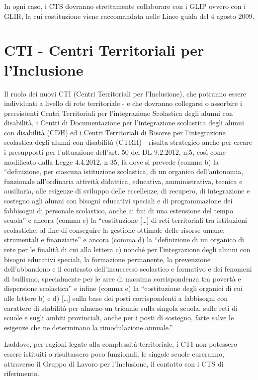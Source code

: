 In ogni caso, i CTS dovranno strettamente collaborare con i GLIP ovvero con i GLIR, la cui
costituzione viene raccomandata nelle Linee guida del 4 agosto 2009.
\section*{CTI - Centri Territoriali per l'Inclusione}
Il ruolo dei nuovi CTI (Centri Territoriali per l'Inclusione), che potranno essere individuati a
livello di rete territoriale - e che dovranno collegarsi o assorbire i preesistenti Centri Territoriali per
l'integrazione Scolastica degli alunni con disabilità, i Centri di Documentazione per l'integrazione
scolastica degli alunni con disabilità (CDH) ed i Centri Territoriali di Risorse per l'integrazione
scolastica degli alunni con disabilità (CTRH) - risulta strategico anche per creare i presupposti per
l'attuazione dell'art. 50 del DL 9.2.2012, n.5, così come modificato dalla Legge 4.4.2012, n 35, là
dove si prevede (comma b) la “definizione, per ciascuna istituzione scolastica, di un organico
dell'autonomia, funzionale all'ordinaria attività didattica, educativa, amministrativa, tecnica e
ausiliaria, alle esigenze di sviluppo delle eccellenze, di recupero, di integrazione e sostegno agli
alunni con bisogni educativi speciali e di programmazione dei fabbisogni di personale scolastico,
anche ai fini di una estensione del tempo scuola” e ancora (comma c) la “costituzione […] di reti
territoriali tra istituzioni scolastiche, al fine di conseguire la gestione ottimale delle risorse umane,
strumentali e finanziarie” e ancora (comma d) la “definizione di un organico di rete per le finalità
di cui alla lettera c) nonché per l'integrazione degli alunni con bisogni educativi speciali, la
formazione permanente, la prevenzione dell'abbandono e il contrasto dell'insuccesso scolastico e
formativo e dei fenomeni di bullismo, specialmente per le aree di massima corrispondenza tra
povertà e dispersione scolastica” e infine (comma e) la “costituzione degli organici di cui alle
lettere b) e d) […] sulla base dei posti corrispondenti a fabbisogni con carattere di stabilità per
almeno un triennio sulla singola scuola, sulle reti di scuole e sugli ambiti provinciali, anche per i
posti di sostegno, fatte salve le esigenze che ne determinano la rimodulazione annuale.”

Laddove, per ragioni legate alla complessità territoriale, i CTI non potessero essere istituiti o
risultassero poco funzionali, le singole scuole cureranno, attraverso il Gruppo di Lavoro per
l'Inclusione, il contatto con i CTS di riferimento.

